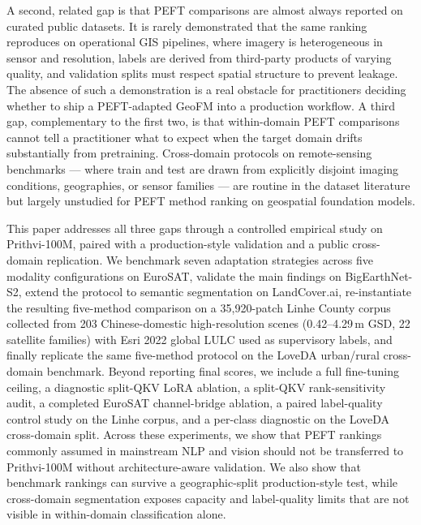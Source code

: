 A second, related gap is that PEFT comparisons are almost always reported on curated public datasets. It is rarely demonstrated that the same ranking reproduces on operational GIS pipelines, where imagery is heterogeneous in sensor and resolution, labels are derived from third-party products of varying quality, and validation splits must respect spatial structure to prevent leakage. The absence of such a demonstration is a real obstacle for practitioners deciding whether to ship a PEFT-adapted GeoFM into a production workflow. A third gap, complementary to the first two, is that within-domain PEFT comparisons cannot tell a practitioner what to expect when the target domain drifts substantially from pretraining. Cross-domain protocols on remote-sensing benchmarks --- where train and test are drawn from explicitly disjoint imaging conditions, geographies, or sensor families --- are routine in the dataset literature but largely unstudied for PEFT method ranking on geospatial foundation models.

This paper addresses all three gaps through a controlled empirical study on Prithvi-100M, paired with a production-style validation and a public cross-domain replication. We benchmark seven adaptation strategies across five modality configurations on EuroSAT, validate the main findings on BigEarthNet-S2, extend the protocol to semantic segmentation on LandCover.ai, re-instantiate the resulting five-method comparison on a 35{,}920-patch Linhe County corpus collected from 203 Chinese-domestic high-resolution scenes (0.42--4.29\,m GSD, 22 satellite families) with Esri 2022 global LULC used as supervisory labels, and finally replicate the same five-method protocol on the LoveDA urban/rural cross-domain benchmark. Beyond reporting final scores, we include a full fine-tuning ceiling, a diagnostic split-QKV LoRA ablation, a split-QKV rank-sensitivity audit, a completed EuroSAT channel-bridge ablation, a paired label-quality control study on the Linhe corpus, and a per-class diagnostic on the LoveDA cross-domain split. Across these experiments, we show that PEFT rankings commonly assumed in mainstream NLP and vision should not be transferred to Prithvi-100M without architecture-aware validation. We also show that benchmark rankings can survive a geographic-split production-style test, while cross-domain segmentation exposes capacity and label-quality limits that are not visible in within-domain classification alone.

